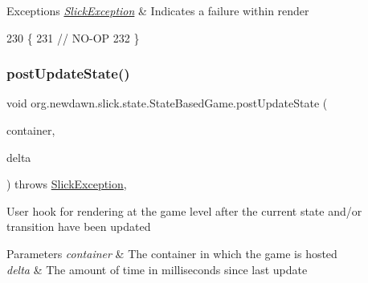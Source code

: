 \begin{DoxyExceptions}{Exceptions}
{\em \mbox{\hyperlink{classorg_1_1newdawn_1_1slick_1_1_slick_exception}{Slick\+Exception}}} & Indicates a failure within render \\
\hline
\end{DoxyExceptions}

\begin{DoxyCode}
230                                                                                               \{
231         \textcolor{comment}{// NO-OP}
232     \}
\end{DoxyCode}
\mbox{\label{classorg_1_1newdawn_1_1slick_1_1state_1_1_state_based_game_a7f41471f0544be67c5a747998c3b2910}} 
\subsubsection{\texorpdfstring{post\+Update\+State()}{postUpdateState()}}
{\footnotesize\ttfamily void org.\+newdawn.\+slick.\+state.\+State\+Based\+Game.\+post\+Update\+State (\begin{DoxyParamCaption}\item[{\mbox{\hyperlink{classorg_1_1newdawn_1_1slick_1_1_game_container}{Game\+Container}}}]{container,  }\item[{int}]{delta }\end{DoxyParamCaption}) throws \mbox{\hyperlink{classorg_1_1newdawn_1_1slick_1_1_slick_exception}{Slick\+Exception}}\hspace{0.3cm}{\ttfamily [inline]}, {\ttfamily [protected]}}

User hook for rendering at the game level after the current state and/or transition have been updated


\begin{DoxyParams}{Parameters}
{\em container} & The container in which the game is hosted \\
\hline
{\em delta} & The amount of time in milliseconds since last update \\
\hline
\end{DoxyParams}

